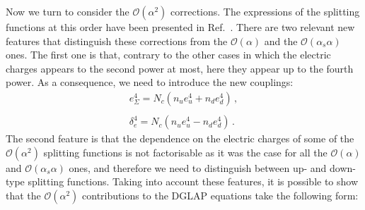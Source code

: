 Now we turn to consider the $\mathcal{O}(\alpha^2)$ corrections.
%
The expressions of the splitting functions at this order have been
presented in Ref.~\cite{deFlorian:2016gvk}.
%
There are two relevant new features that distinguish these corrections
from the $\mathcal{O}(\alpha)$ and the $\mathcal{O}(\alpha_s\alpha)$
ones.
%
The first one is that, contrary to the other cases in which the
electric charges appears to the second power at most, here they appear
up to the fourth power.
%
As a consequence, we need to introduce the new couplings:
\begin{equation}
\begin{array}{l}
e_{\Sigma}^4 = N_c(n_{u} e_u^4 + n_{d} e_d^4)\,,\\
\\
\delta_e^4 = N_c(n_{u} e_u^4 - n_{d} e_d^4)\,.
\end{array}
\end{equation}
The second feature is that the dependence on the electric charges of
some of the $\mathcal{O}(\alpha^2)$ splitting functions is not
factorisable as it was the case for all the $\mathcal{O}(\alpha)$ and
$\mathcal{O}(\alpha_s\alpha)$ ones, and therefore we need to
distinguish between up- and down-type splitting functions.
%
Taking into account these features, it is possible to show that the
$\mathcal{O}(\alpha^2)$ contributions to the DGLAP equations take the
following form:
